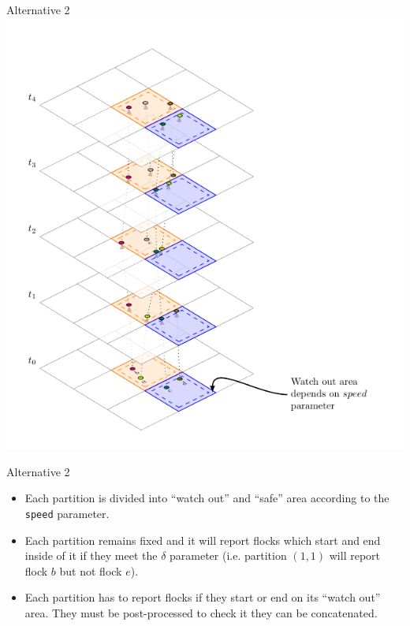 \documentclass{beamer}
\begin{document}
\begin{frame}{Alternative 2}
    \centering
    \includegraphics[height=0.95\textheight]{Figures/A2/T4}
\end{frame}

\begin{frame}{Alternative 2}
    \begin{itemize}
        \item Each partition is divided into ``watch out'' and ``safe'' area according to the \texttt{speed} parameter.
        \item Each partition remains fixed and it will report flocks which start and end inside of it if they meet the $\delta$ parameter (i.e. partition $(1,1)$ will report flock $b$ but not flock $e$).
        \item Each partition has to report flocks if they start or end on its ``watch out'' area. They must be post-processed to check it they can be concatenated.  
    \end{itemize}
\end{frame}
\end{document}
